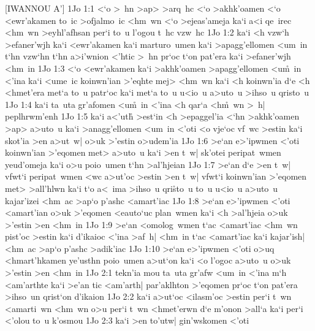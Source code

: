 [IWANNOU A']
\vs 1Jo 1:1
<`o
>~hn
>ap>
>arq~hc
<`o
>akhk'oamen
<`o
<ewr'akamen
to~ic
>ofjalmo~ic
<hm~wn
<`o
>ejeas'ameja
ka`i
a<i
qe~irec
<hm~wn
>eyhl'afhsan
per`i
to~u
l'ogou
t~hc
vzw~hc\bibvsend
\vs 1Jo 1:2
ka`i
<h
vzw`h
>efaner'wjh
ka`i
<ewr'akamen
ka`i
marturo~umen
ka`i
>apagg'ellomen
<um~in
t`hn
vzw`hn
t`hn
a>i'wnion
<'htic
>~hn
pr`oc
t`on
pat'era
ka`i
>efaner'wjh
<hm~in\bibvsend
\vs 1Jo 1:3
<`o
<ewr'akamen
ka`i
>akhk'oamen
>apagg'ellomen
<u\r{m}~in
<'ina
ka`i
<ume~ic
koinwn'ian
>'eqhte
mej>
<hm~wn
ka`i
<h
koinwn'ia
d`e
<h
<hmet'era
met`a
to~u
patr`oc
ka`i
met`a
to~u
u<io~u
a>uto~u
>ihso~u
qristo~u\bibvsend
\vs 1Jo 1:4
ka`i
ta~uta
gr'afomen
<u\r{m}~in
<'ina
<h
qar`a
<h\r{m}~wn
>~h|
peplhrwm'enh\bibvsend
\vs 1Jo 1:5
ka`i
a<'uth\r{}
>est`in
<h
>epaggel'ia
<`hn
>akhk'oamen
>ap>
a>uto~u
ka`i
>anagg'ellomen
<um~in
<'oti
<o
vje`oc
vf~wc
>estin
ka`i
skot'ia
>en
a>ut~w|
o>uk
>'estin
o>udem'ia\bibvsend
\vs 1Jo 1:6
>e`an
e>'ipwmen
<'oti
koinwn'ian
>'eqomen
met>
a>uto~u
ka`i
>en
t~w|
sk'otei
peripat~wmen
yeud'omeja
ka`i
o>u
poio~umen
t`hn
>al'hjeian\bibvsend
\vs 1Jo 1:7
>e`an
d`e
>en
t~w|
vfwt`i
peripat~wmen
<wc
a>ut'oc
>estin
>en
t~w|
vfwt`i
koinwn'ian
>'eqomen
met>
>all'hlwn
ka`i
t`o
a<~ima
>ihso~u
qri\r{s}to~u
to~u
u<io~u
a>uto~u
kajar'izei
<hm~ac
>ap`o
p'ashc
<amart'iac\bibvsend
\vs 1Jo 1:8
>e`an
e>'ipwmen
<'oti
<amart'ian
o>uk
>'eqomen
<eauto`uc
plan~wmen
ka`i
<h
>al'hjeia
o>uk
>'estin
>en
<hm~in\bibvsend
\vs 1Jo 1:9
>e`an
<omolog~wmen
t`ac
<amart'iac
<hm~wn
pist'oc
>estin
ka`i
d'ikaioc
<'ina
>af~h|
<hm~in
t`ac
<amart'iac
ka`i
kajar'ish|
<hm~ac
>ap`o
p'ashc
>adik'iac\bibvsend
\vs 1Jo 1:10
>e`an
e>'ipwmen
<'oti
o>uq
<hmart'hkamen
ye'usthn
poio~umen
a>ut`on
ka`i
<o
l'ogoc
a>uto~u
o>uk
>'estin
>en
<hm~in\bibvsend
\vs 1Jo 2:1
tekn'ia
mou
ta~uta
gr'afw
<um~in
<'ina
m`h
<am'arthte
ka`i
>e'an
tic
<am'arth|
par'aklhton
>'eqomen
pr`oc
t`on
pat'era
>ihso~un
qrist`on
d'ikaion\bibvsend
\vs 1Jo 2:2
ka`i
a>ut`oc
<ilasm'oc
>estin
per`i
t~wn
<amarti~wn
<hm~wn
o>u
per`i
t~wn
<hmet'erwn
d`e
m'onon
>all`a
ka`i
per`i
<'olou
to~u
k'osmou\bibvsend
\vs 1Jo 2:3
ka`i
>en
to'utw|
gin'wskomen
<'oti
